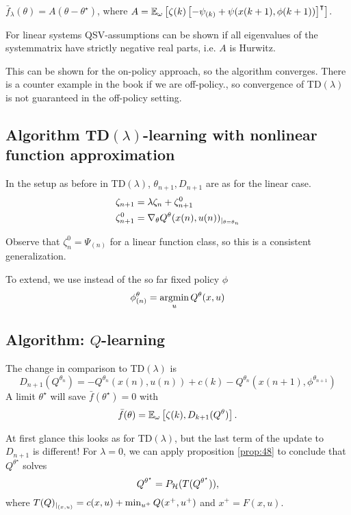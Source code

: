 \(\bar{f}_\lambda(\theta)=A(\theta-\theta^\star)\), where 
\(A=\mathbb{E}_\omega\left[\zeta(k)\left[-\psi_{(k)}+\psi(x(k+1),\phi(k+1))\right]^\intercal\right]\).

For linear systems QSV-assumptions can be shown if all eigenvalues of the systemmatrix have 
strictly negative real parts,  i.e. \(A\) is Hurwitz.

This can be shown for the on-policy approach, so the algorithm converges. There is a counter example in the book
if we are off-policy., so convergence of TD\((\lambda)\) is not guaranteed in the off-policy setting.

\subsection{Algorithm TD\((\lambda)\)-learning with nonlinear function approximation}

In the setup as before in TD\((\lambda)\), \(\theta_{n+1},D_{n+1}\) are 
as for the linear case.
\begin{align*}
    \zeta_{n+1}&=\lambda\zeta_{n}+\zeta_{n+1}^0\\
    \zeta_{n+1}^0&=\nabla_\theta Q^\theta(x(n),u(n))_{|_{\theta=\theta_n}}  
\end{align*}

Observe that \(\zeta_n^0=\Psi_{(n)}\) for a linear function class, so this is a consistent 
generalization.

To extend, we use instead of the so far fixed policy \(\phi\)
\[\phi_{(n)}^\theta=\operatorname*{\text{argmin}}_{u} Q^\theta(x,u)\]
\subsection{Algorithm: \(Q\)-learning}
The change in comparison to TD\((\lambda)\) is  
\[D_{n+1}(Q^{\theta_n})=-Q^{\theta_n}(x(n),u(n))+c(k)-Q^{\theta_n}(x(n+1),\phi^{\theta_{n+1}})\]
A limit \(\theta^\star\) will save \(\bar{f}(\theta^\star)=0\) with 
\[\bar{f}(\theta) = \mathbb{E}_\omega\left[\zeta(k),D_{k+1}(Q^\theta)\right].\]

At first glance this looks as for TD\((\lambda)\), but the last term of the update to \(D_{n+1}\)
is different! For \(\lambda=0\), we can apply proposition \ref{prop:48} to conclude that 
\(Q^{\theta^\star}\) solves 
\[Q^{\theta^\star}=P_{\mathcal{H}}(T(Q^{\theta^\star})),\]
where \(T(Q)_{|_{(x,u)}}=c(x,u)+\min_{u^+}Q(x^+,u^+)\) and \(x^+=F(x,u)\).

